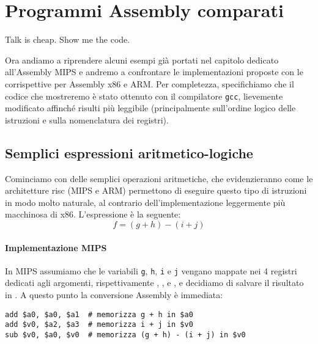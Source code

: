 \documentclass[class=book, crop=false, oneside]{standalone}
\begin{document}
\chapter{Programmi Assembly comparati}\label{ch:asm}
\begin{fquote}Talk is cheap. Show me the code.\end{fquote}
Ora andiamo a riprendere alcuni esempi già portati nel capitolo dedicato all'Assembly MIPS e andremo a confrontare le implementazioni proposte con le corrispettive per Assembly x86 e ARM.
Per completezza, specifichiamo che il codice che mostreremo è stato ottenuto con il compilatore \texttt{gcc}, lievemente modificato affinché risulti più leggibile (principalmente sull'ordine logico delle istruzioni e sulla nomenclatura dei registri).

\section{Semplici espressioni aritmetico-logiche}
Cominciamo con delle semplici operazioni aritmetiche, che evidenzieranno come le architetture \acrshort{risc} (MIPS e ARM) permettono di eseguire questo tipo di istruzioni in modo molto naturale, al contrario dell'implementazione leggermente più macchinosa di x86. L'espressione è la seguente:
\begin{equation*}
	f = (g + h) - (i + j)
\end{equation*}

\subsubsection{Implementazione MIPS}
In MIPS assumiamo che le variabili \texttt{g}, \texttt{h}, \texttt{i} e \texttt{j} vengano mappate nei 4 registri dedicati agli argomenti, rispettivamente , ,  e , e decidiamo di salvare il risultato in . A questo punto la conversione Assembly è immediata:
\begin{verbatim}
add $a0, $a0, $a1  # memorizza g + h in $a0
add $v0, $a2, $a3  # memorizza i + j in $v0
sub $v0, $a0, $v0  # memorizza (g + h) - (i + j) in $v0
\end{verbatim}
\end{document}

